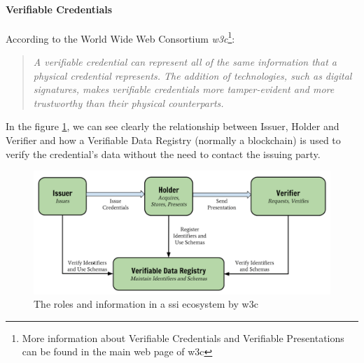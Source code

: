 \documentclass[a4paper, 12pt]{article} %
\begin{document}
                \paragraph{Verifiable Credentials}
                    According to the World Wide Web Consortium \textit{\acrshort{w3c}}\cite{w3c-vc}\footnote{\label{footnote-w3c}More information about Verifiable Credentials and Verifiable Presentations can be found in the main web page of \acrshort{w3c}\cite{w3c-vc}}:
                    \begin{quote}
                        \textit{A verifiable credential can represent all of the same information that a physical credential represents. The addition of technologies, such as digital signatures, makes verifiable credentials more tamper-evident and more trustworthy than their physical counterparts.}
                    \end{quote}
                    In the figure \ref{fig:ssi-vc}, we can see clearly the relationship between Issuer, Holder and Verifier and how a Verifiable Data Registry (normally a blockchain) is used to verify the credential's data without the need to contact the issuing party.
                    \begin{figure}[h]
                        \centering
                        \includegraphics[width=1.0\textwidth]{ssi-vc.png}
                        \caption{The roles and information in a \acrshort{ssi} ecosystem by \acrshort{w3c}}
                        \label{fig:ssi-vc}
                    \end{figure}
                
\end{document}
